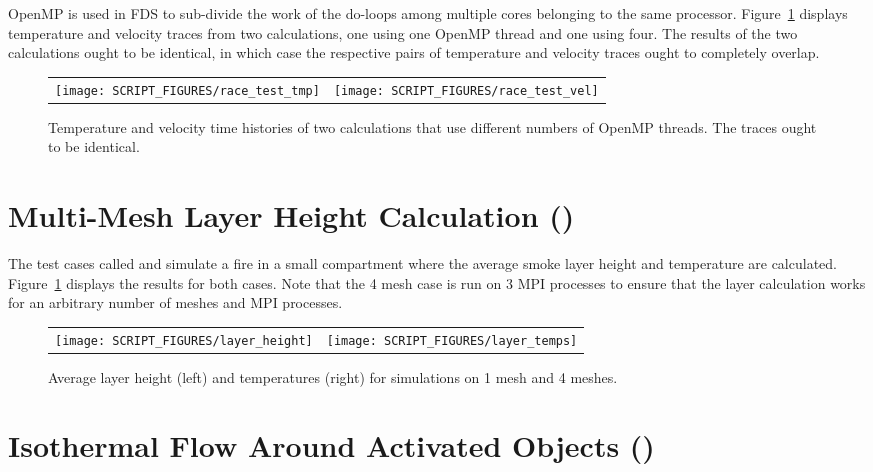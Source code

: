 \documentclass[11pt]{book}
\begin{document}
OpenMP is used in FDS to sub-divide the work of the do-loops among multiple cores belonging to the same processor. Figure~\ref{race_test_fig} displays temperature and velocity traces from two calculations, one using one OpenMP thread and one using four. The results of the two calculations ought to be identical, in which case the respective pairs of temperature and velocity traces ought to completely overlap.

\begin{figure}[!ht]
\begin{tabular*}{\textwidth}{lr}
\texttt{[image: SCRIPT\_FIGURES/race\_test\_tmp]} &
\texttt{[image: SCRIPT\_FIGURES/race\_test\_vel]}
\end{tabular*}
\caption[Result of the ]{Temperature and velocity time histories of two calculations that use different numbers of OpenMP threads. The traces ought to be identical.}
\label{race_test_fig}
\end{figure}


\newpage

\section{Multi-Mesh Layer Height Calculation (\texorpdfstring{}{layer})}
\label{layer}

The test cases called  and  simulate a fire in a small compartment where the average smoke layer height and temperature are calculated. Figure~\ref{race_test_fig} displays the results for both cases. Note that the 4 mesh case is run on 3 MPI processes to ensure that the layer calculation works for an arbitrary number of meshes and MPI processes.

\begin{figure}[!ht]
\begin{tabular*}{\textwidth}{lr}
\texttt{[image: SCRIPT\_FIGURES/layer\_height]} &
\texttt{[image: SCRIPT\_FIGURES/layer\_temps]}
\end{tabular*}
\caption[Result of the  test cases]{Average layer height (left) and temperatures (right) for simulations on 1 mesh and 4 meshes.}
\label{layer_fig}
\end{figure}


\section{Isothermal Flow Around Activated Objects (\texorpdfstring{}{obst\_activation})}
\label{obst_activation}
\end{document}
